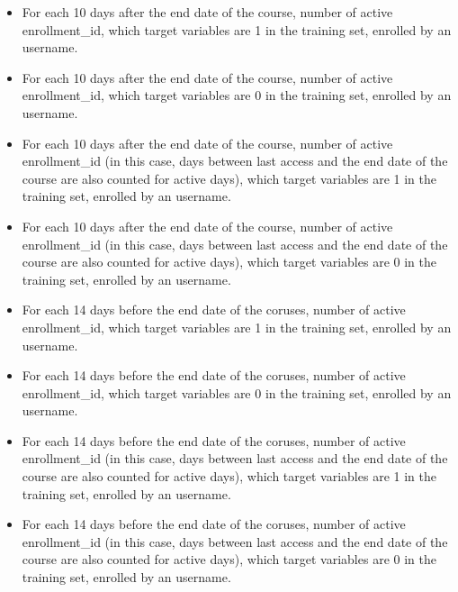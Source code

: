 \begin{itemize}
  \setlength\itemsep{0em}
  \item For each 10 days after the end date of the course, number of active enrollment\_id, which target variables are 1 in the training set, enrolled by an username.
  \item For each 10 days after the end date of the course, number of active enrollment\_id, which target variables are 0 in the training set, enrolled by an username.
  \item For each 10 days after the end date of the course, number of active enrollment\_id (in this case, days between last access and the end date of the course are also counted for active days), which target variables are 1 in the training set, enrolled by an username.
  \item For each 10 days after the end date of the course, number of active enrollment\_id (in this case, days between last access and the end date of the course are also counted for active days), which target variables are 0 in the training set, enrolled by an username.
  \item For each 14 days before the end date of the coruses, number of active enrollment\_id, which target variables are 1 in the training set, enrolled by an username.
  \item For each 14 days before the end date of the coruses, number of active enrollment\_id, which target variables are 0 in the training set, enrolled by an username.
  \item For each 14 days before the end date of the coruses, number of active enrollment\_id (in this case, days between last access and the end date of the course are also counted for active days), which target variables are 1 in the training set, enrolled by an username.
  \item For each 14 days before the end date of the coruses, number of active enrollment\_id (in this case, days between last access and the end date of the course are also counted for active days), which target variables are 0 in the training set, enrolled by an username.
\end{itemize}
